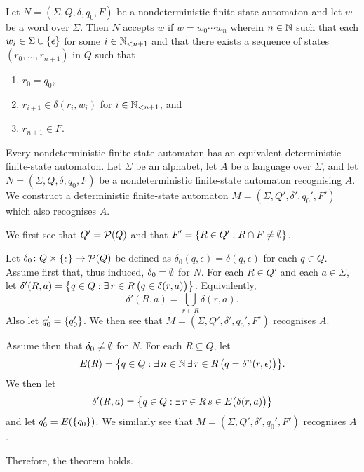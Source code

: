 Let \(N = (\Sigma, Q, \delta, q_0, F)\) be a nondeterministic finite-state
automaton and let \(w\) be a word over \(\Sigma\). Then \(N\) accepts \(w\) if
\(w = w_0 \cdots w_n\) wherein \(n \in \setnat\) such that each \(w_i \in \Sigma
\cup \set{\epsilon}\) for some \(i \in \Nln[n + 1]\) and that there exists a
sequence of states \((r_0, \ldots, r_{n + 1})\) in \(Q\) such that
\begin{enumerate}
    \item \(r_0 = q_0\),
    \item \(r_{i + 1} \in \delta(r_i, w_i)\) for \(i \in \Nln[n + 1]\), and
    \item \(r_{n + 1} \in F\).
\end{enumerate}

\Bth
    \label{thm1}
    Every nondeterministic finite-state automaton has an equivalent
    deterministic finite-state automaton.
\Eth
\Bpr
    Let \(\Sigma\) be an alphabet, let \(A\) be a language over \(\Sigma\), and
    let \(N = (\Sigma, Q, \delta, q_0, F)\) be a nondeterministic finite-state
    automaton recognising \(A\). We construct a deterministic finite-state
    automaton \(M = (\Sigma, Q', \delta', q_0', F')\) which also recognises
    \(A\).

    We first see that \(Q' = \pow(Q)\) and that \(F' = \set{R \in Q' : R \cap F
    \neq \nset}\).

    Let \(\map{\delta_0}{Q \times \set{\epsilon}}{\pow(Q)}\) be defined as
    \(\delta_0(q, \epsilon) = \delta(q, \epsilon)\) for each \(q \in Q\). Assume
    first that, thus induced, \(\delta_0 = \nset\) for \(N\). For each \(R \in
    Q'\) and each \(a \in \Sigma\), let \(\delta'(R, a) = \set*{q \in Q :
    \exists \, r \in R \, \big(q \in \delta(r, a)\big)}\). Equivalently,
    \[
        \delta'(R, a) = \bigcup_{r \in R} \delta(r, a).
    \]
    Also let \(q_0' = \set{q_0'}\). We then see that \(M = (\Sigma, Q', \delta',
    q_0', F')\) recognises \(A\).

    Assume then that \(\delta_0 \neq \nset\) for \(N\). For each \(R \subseteq Q
    \), let
    \[
        E(R) = \set*{q \in Q : \exists \, n \in \setnat \, \exists \, r \in R \,
        \big(q = \delta^n(r, \epsilon)\big)}.
    \]
    We then let
    \[
        \delta'(R, a) = \set*{q \in Q : \exists \, r \in R \, s \in
        E\big(\delta(r, a)\big)}
    \]
    and let \(q_0' = E(\set{q_0})\). We similarly see that \(M = (\Sigma, Q',
    \delta', q_0', F')\) recognises \(A\).

    Therefore, the theorem holds.
\Epr

